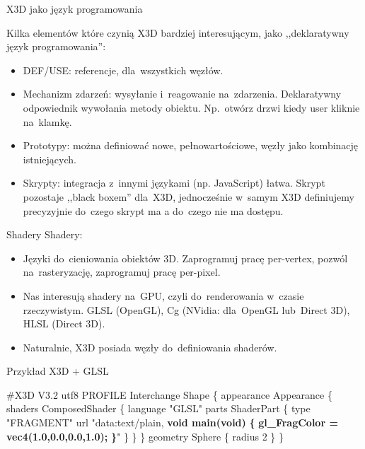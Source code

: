 \documentclass{beamer}
\begin{document}
\begin{frame}{X3D jako język programowania}

Kilka elementów które czynią X3D bardziej interesującym,
jako ,,deklaratywny język programowania'':

\begin{itemize}
  \item DEF/USE: referencje, dla~wszystkich węzłów.
  \item Mechanizm zdarzeń: wysyłanie i~reagowanie na~zdarzenia.
    Deklaratywny odpowiednik wywołania metody obiektu.
    Np.~otwórz drzwi kiedy user kliknie na~klamkę.
  \item Prototypy: można definiować nowe, pełnowartościowe,
    węzły jako kombinację istniejących.
  \item Skrypty: integracja z~innymi językami (np. JavaScript) łatwa.
    Skrypt pozostaje ,,black boxem'' dla~X3D, jednocześnie w~samym
    X3D definiujemy precyzyjnie do~czego skrypt ma a do~czego nie ma dostępu.
\end{itemize}
\end{frame}

\begin{frame}{Shadery}
Shadery:
\begin{itemize}
  \item Języki do~cieniowania obiektów 3D. Zaprogramuj pracę per-vertex,
    pozwól na~rasteryzację, zaprogramuj pracę per-pixel.
  \item Nas interesują shadery na~GPU, czyli do~renderowania w~czasie
    rzeczywistym. GLSL (OpenGL), Cg (NVidia: dla~OpenGL lub~Direct 3D),
    HLSL (Direct 3D).
  \item Naturalnie, X3D posiada węzły do~definiowania shaderów.
\end{itemize}
\end{frame}

\begin{frame}[fragile]
\begin{exampleblock}{Przykład X3D + GLSL}
\begin{semiverbatim}
\#X3D V3.2 utf8
PROFILE Interchange
Shape \{
  appearance Appearance \{
    shaders ComposedShader \{
      language "GLSL"
      parts ShaderPart \{
        type "FRAGMENT"
        url "data:text/plain,
        \textbf{void main(void)}
        \textbf{\{}
          \textbf{gl\_FragColor = vec4(1.0,0.0,0.0,1.0);}
        \textbf{\}}" \} \} \}
  geometry Sphere \{ radius 2 \}
\}
\end{semiverbatim}
\end{exampleblock}
\end{frame}
\end{document}
